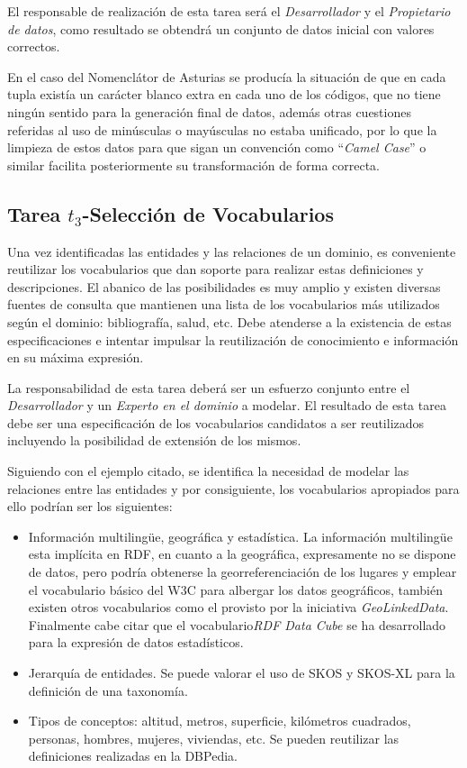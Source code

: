 El responsable de realización de esta tarea será el \textit{Desarrollador} y el \textit{Propietario de datos}, como resultado se obtendrá
un conjunto de datos inicial con valores correctos.

En el caso del Nomenclátor de Asturias se producía la situación de que en cada tupla existía un carácter blanco extra
en cada uno de los códigos, que no tiene ningún sentido para la generación final de datos, además otras cuestiones referidas al 
uso de minúsculas o mayúsculas no estaba unificado, por lo que la limpieza de estos datos para que sigan un convención
como ``\textit{Camel Case}'' o similar facilita posteriormente su transformación de forma correcta.


\subsection{Tarea $t_3$-Selección de Vocabularios}
Una vez identificadas las entidades y las relaciones de un dominio, es conveniente
reutilizar los vocabularios que dan soporte para realizar estas definiciones y descripciones. El abanico
de las posibilidades es muy amplio y existen diversas fuentes de consulta que mantienen una lista
de los vocabularios más utilizados según el dominio: bibliografía, salud, etc. Debe atenderse 
a la existencia de estas especificaciones e intentar impulsar la reutilización de conocimiento e información en 
su máxima expresión. 

La responsabilidad de esta tarea deberá ser un esfuerzo conjunto entre el \textit{Desarrollador} y un \textit{Experto en el dominio} a 
modelar. El resultado de esta tarea debe ser una especificación de los vocabularios candidatos
a ser reutilizados incluyendo la posibilidad de extensión de los mismos.

Siguiendo con el ejemplo citado, se identifica la necesidad de modelar las relaciones entre las entidades y por consiguiente, los vocabularios
apropiados para ello podrían ser los siguientes:
\begin{itemize}
 \item Información multiling\"{u}e, geográfica y estadística. La información multiling\"{u}e esta implícita
en \gls{RDF}, en cuanto a la geográfica, expresamente no se dispone de datos, pero podría obtenerse la georreferenciación de los
lugares y emplear el vocabulario básico del \gls{W3C} para albergar los datos geográficos, también existen otros vocabularios como el provisto por la iniciativa 
\textit{GeoLinkedData}. Finalmente cabe citar que el vocabulario\textit{RDF Data Cube} se ha desarrollado para la expresión de datos estadísticos.
 \item Jerarquía de entidades. Se puede valorar el uso de \gls{SKOS} y \gls{SKOS-XL} para la definición de una taxonomía.
 \item Tipos de conceptos: altitud, metros, superficie, kilómetros cuadrados, personas, hombres, mujeres, viviendas, etc. Se pueden reutilizar
las definiciones realizadas en la DBPedia.
\end{itemize}


